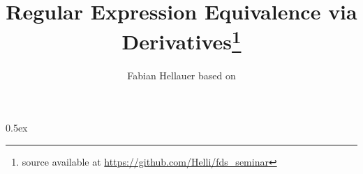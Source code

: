 \documentclass[11pt,a4paper]{article}
\begin{document}
\title{Regular Expression Equivalence via Derivatives\footnote{source available at \url{https://github.com/Helli/fds_seminar}}}
\author{Fabian Hellauer based on \cite{Krauss-Nipkow-JAR}}
\maketitle

\tableofcontents

\parindent 0pt\parskip 0.5ex





\end{document}
